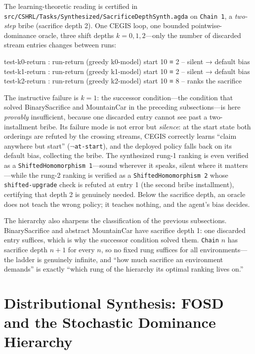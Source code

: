 \documentclass[9pt,a4paper]{article}
\newcommand{\fpath}[1]{\nolinkurl{#1}}
\theoremstyle{plain}
\theoremstyle{definition}
\theoremstyle{remark}
\begin{document}
The learning-theoretic reading is certified in \fpath{src/CSHRL/Tasks/Synthesized/SacrificeDepthSynth.agda} on \texttt{Chain 1}, a \emph{two-step} bribe (sacrifice depth 2).  One CEGIS loop, one bounded pointwise-dominance oracle, three shift depths $k = 0, 1, 2$---only the number of discarded stream entries changes between runs:
\begin{spec}
test-k0-return : run-return (greedy k0-model) start 10 ≡ 2   -- silent → default bias
test-k1-return : run-return (greedy k1-model) start 10 ≡ 2   -- silent → default bias
test-k2-return : run-return (greedy k2-model) start 10 ≡ 8   -- ranks the sacrifice
\end{spec}
The instructive failure is $k = 1$: the successor condition---the condition that solved BinarySacrifice and MountainCar in the preceding subsections---is here \emph{provably} insufficient, because one discarded entry cannot see past a two-installment bribe.  Its failure mode is not error but \emph{silence}: at the start state both orderings are refuted by the crossing streams, CEGIS correctly learns ``claim anywhere but start'' ($\neg$\texttt{at-start}), and the deployed policy falls back on its default bias, collecting the bribe.  The synthesized rung-1 ranking is even verified as a \texttt{ShiftedHomomorphism 1}---sound wherever it speaks, silent where it matters---while the rung-2 ranking is verified as a \texttt{ShiftedHomomorphism 2} whose \texttt{shifted-upgrade} check is refuted at entry 1 (the second bribe installment), certifying that depth 2 is genuinely needed.  Below the sacrifice depth, an oracle does not teach the wrong policy; it teaches nothing, and the agent's bias decides.

The hierarchy also sharpens the classification of the previous subsections.  BinarySacrifice and abstract MountainCar have sacrifice depth 1: one discarded entry suffices, which is why the successor condition solved them.  \texttt{Chain} $n$ has sacrifice depth $n{+}1$ for every $n$, so no fixed rung suffices for all environments---the ladder is genuinely infinite, and ``how much sacrifice an environment demands'' is exactly ``which rung of the hierarchy its optimal ranking lives on.''


\section{Distributional Synthesis: FOSD and the Stochastic Dominance Hierarchy}
\end{document}
